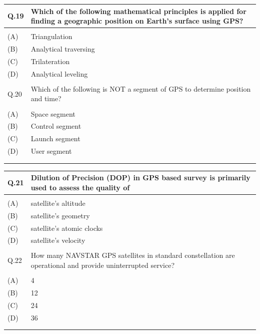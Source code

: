 \documentclass[12pt]{article}
\begin{document}
\begin{table}[H]
\renewcommand{\arraystretch}{3}
\setlength{\tabcolsep}{8pt}
\begin{tabular}{|l|p{15cm}|}
\hline

Q.19 &Which of the following mathematical principles is applied for finding a
geographic position on Earth’s surface using GPS?\\ \hline 
 & \\ \hline
(A)&Triangulation\\ \hline
(B)&Analytical traversing \\ \hline
(C)&Trilateration\\ \hline
(D)&Analytical leveling \\ \hline
 & \\ \hline

Q.20 & Which of the following is NOT a segment of GPS to determine position and time?\\ \hline
 & \\ \hline
(A)&Space segment\\ \hline
(B)&Control segment\\ \hline
(C)&Launch segment\\ \hline
(D)&User segment\\ \hline
 & \\ 
 & \\ \hline

 

\end{tabular}
\end{table}


\begin{table}[H]
\renewcommand{\arraystretch}{3}
\setlength{\tabcolsep}{8pt}
\begin{tabular}{|l|p{15cm}|}
\hline

Q.21 &Dilution of Precision (DOP) in GPS based survey is primarily used to assess the
quality of\\ \hline 
 & \\ \hline
(A)&satellite’s altitude\\ \hline
(B)&satellite’s geometry \\ \hline
(C)&satellite’s atomic clocks\\ \hline
(D)&satellite’s velocity \\ \hline
 & \\ \hline

Q.22 & How many NAVSTAR GPS satellites in standard constellation are operational
and provide uninterrupted service?\\ \hline
 & \\ \hline
(A)&4\\ \hline
(B)&12\\ \hline
(C)&24\\ \hline
(D)&36\\ \hline
 & \\ 
 & \\ \hline

 

\end{tabular}
\end{table}
\end{document}
